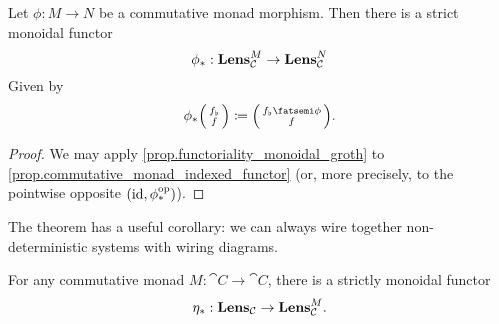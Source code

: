 \documentclass[DynamicalBook]{subfiles}
\begin{document}
\begin{corollary}
  Let $\phi : M \to N$ be a commutative monad morphism. Then there is a strict
  monoidal functor 
$$\phi_{\ast} : \textbf{Lens}_{\mathcal{C}}^M \to \textbf{Lens}_{\mathcal{C}}^N$$
Given by 
$$\phi_{\ast} \lens{f_{\flat}}{f} \coloneqq \lens{f_{\flat} \then \phi}{f}.$$
\end{corollary}
\begin{proof}
We may apply \cref{prop.functoriality_monoidal_groth} to
\cref{prop.commutative_monad_indexed_functor} (or, more precisely, to the
pointwise opposite $(\mathrm{id}, \phi_{\ast}^{\textnormal{op}})$).
\end{proof}

The theorem has a useful corollary: we can always wire together
non-deterministic systems with wiring diagrams.
\begin{corollary}
  For any commutative monad $M : \cat{C} \to \cat{C}$, there is a strictly
  monoidal functor 
$$\eta_{\ast} : \textbf{Lens}_{\mathcal{C}} \to \textbf{Lens}_{\mathcal{C}}^M.$$ 
\end{corollary}
\end{document}
